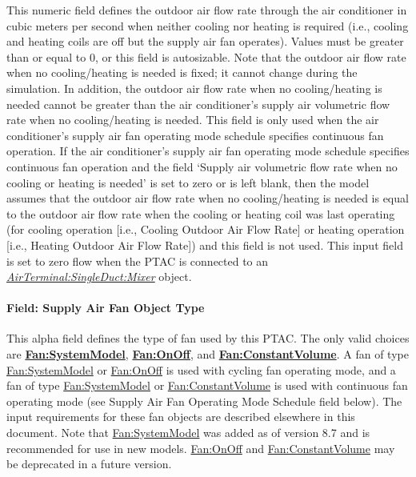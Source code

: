 This numeric field defines the outdoor air flow rate through the air conditioner in cubic meters per second when neither cooling nor heating is required (i.e., cooling and heating coils are off but the supply air fan operates). Values must be greater than or equal to 0, or this field is autosizable. Note that the outdoor air flow rate when no cooling/heating is needed is fixed; it cannot change during the simulation. In addition, the outdoor air flow rate when no cooling/heating is needed cannot be greater than the air conditioner's supply air volumetric flow rate when no cooling/heating is needed. This field is only used when the air conditioner's supply air fan operating mode schedule specifies continuous fan operation. If the air conditioner's supply air fan operating mode schedule specifies continuous fan operation and the field `Supply air volumetric flow rate when no cooling or heating is needed' is set to zero or is left blank, then the model assumes that the outdoor air flow rate when no cooling/heating is needed is equal to the outdoor air flow rate when the cooling or heating coil was last operating (for cooling operation {[}i.e., Cooling Outdoor Air Flow Rate{]} or heating operation {[}i.e., Heating Outdoor Air Flow Rate{]}) and this field is not used. This input field is set to zero flow when the PTAC is connected to an \textit{\hyperref[airterminalsingleductmixer]{AirTerminal:SingleDuct:Mixer}} object.

\paragraph{Field: Supply Air Fan Object Type}\label{field-supply-air-fan-object-type-5}

This alpha field defines the type of fan used by this PTAC. The only valid choices are \textbf{\hyperref[fansystemmodel]{Fan:SystemModel}}, \textbf{\hyperref[fanonoff]{Fan:OnOff}}, and \textbf{\hyperref[fanconstantvolume]{Fan:ConstantVolume}}. A fan of type \hyperref[fansystemmodel]{Fan:SystemModel} or \hyperref[fanonoff]{Fan:OnOff} is used with cycling fan operating mode, and a fan of type \hyperref[fansystemmodel]{Fan:SystemModel} or \hyperref[fanconstantvolume]{Fan:ConstantVolume} is used with continuous fan operating mode (see Supply Air Fan Operating Mode Schedule field below). The input requirements for these fan objects are described elsewhere in this document. Note that \hyperref[fansystemmodel]{Fan:SystemModel} was added as of version 8.7 and is recommended for use in new models.  \hyperref[fanonoff]{Fan:OnOff} and \hyperref[fanconstantvolume]{Fan:ConstantVolume} may be deprecated in a future version.

